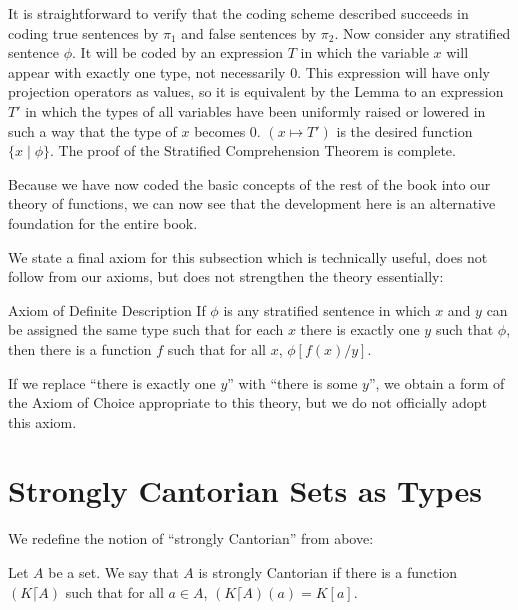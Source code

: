 It is straightforward to verify that the coding scheme described
succeeds in coding true sentences by $\pi_1$ and false sentences by
$\pi_2$.  Now consider any stratified sentence $\phi$.  It will be
coded by an expression $T$ in which the variable $x$ will appear with exactly
one type, not necessarily 0.  This expression will have
only projection 
operators as values, so it is equivalent by the Lemma to an expression $T'$
in which the types of all variables have been uniformly raised or
lowered in such a way that the type of $x$ becomes 0.  $(x \mapsto
T')$ is the desired function $\{x \mid \phi\}$.  The proof of
the Stratified Comprehension Theorem is
complete. 
\finpreuve

Because we have now coded the basic concepts of the rest of the book
into our theory of functions, we can now see that the development here
is an alternative foundation for the entire book.

We state a final axiom for this subsection which is technically
useful, does not follow from our axioms, but does not strengthen the
theory essentially:

\begin{axiom}{Axiom of Definite Description}
 If $\phi$ is any stratified
 sentence in which $x$ and $y$ can be assigned the same type such that for each $x$ there is exactly one $y$ such that $\phi$,
 then there is a function $f$ such that for all $x$,
 $\phi[f(x)/y]$.
\end{axiom}

If we replace ``there is exactly one $y$'' with ``there is some $y$'',
we obtain a form of the Axiom of Choice appropriate to
this theory, 
but we do not officially adopt this axiom.









\section{Strongly Cantorian Sets as Types}

We redefine the notion of ``strongly Cantorian'' from above:

\begin{definition}
 Let $A$ be a set.  We say that $A$ is {\upshape strongly
 Cantorian} if there is a
 function $(K \lceil A)$ such that for all 
 $a \in A$, $(K \lceil A)(a) = K[a]$.
\end{definition}

